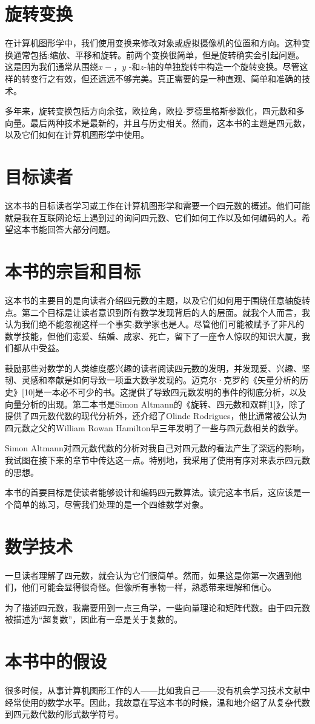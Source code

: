 
\section{旋转变换}
在计算机图形学中，我们使用变换来修改对象或虚拟摄像机的位置和方向。这种变换通常包括:缩放、平移和旋转。前两个变换很简单，但是旋转确实会引起问题。这是因为我们通常从围绕$x-， y$ -和$z$-轴的单独旋转中构造一个旋转变换。尽管这样的转变行之有效，但还远远不够完美。真正需要的是一种直观、简单和准确的技术。

多年来，旋转变换包括方向余弦，欧拉角，欧拉-罗德里格斯参数化，四元数和多向量。最后两种技术是最新的，并且与历史相关。然而，这本书的主题是四元数，以及它们如何在计算机图形学中使用。


\section{目标读者}
这本书的目标读者学习或工作在计算机图形学和需要一个四元数的概述。他们可能就是我在互联网论坛上遇到过的询问四元数、它们如何工作以及如何编码的人。希望这本书能回答大部分问题。


\section{本书的宗旨和目标}
这本书的主要目的是向读者介绍四元数的主题，以及它们如何用于围绕任意轴旋转点。第二个目标是让读者意识到所有数学发现背后的人的层面。就我个人而言，我认为我们绝不能忽视这样一个事实:数学家也是人。尽管他们可能被赋予了非凡的数学技能，但他们恋爱、结婚、成家、死亡，留下了一座令人惊叹的知识大厦，我们都从中受益。

鼓励那些对数学的人类维度感兴趣的读者阅读四元数的发明，并发现爱、兴趣、坚韧、灵感和奉献是如何导致一项重大数学发现的。迈克尔·克罗的《矢量分析的历史》[10]是一本必不可少的书。这提供了导致四元数发明的事件的彻底分析，以及向量分析的出现。第二本书是Simon Altmann的《旋转、四元数和双群[1]》，除了提供了四元数代数的现代分析外，还介绍了Olinde Rodrigues，他比通常被公认为四元数之父的William Rowan Hamilton早三年发明了一些与四元数相关的数学。

Simon Altmann对四元数代数的分析对我自己对四元数的看法产生了深远的影响，我试图在接下来的章节中传达这一点。特别地，我采用了使用有序对来表示四元数的思想。

本书的首要目标是使读者能够设计和编码四元数算法。读完这本书后，这应该是一个简单的练习，尽管我们处理的是一个四维数学对象。

\section{数学技术}
一旦读者理解了四元数，就会认为它们很简单。然而，如果这是你第一次遇到他们，他们可能会显得很奇怪。但像所有事物一样，熟悉带来理解和信心。

为了描述四元数，我需要用到一点三角学，一些向量理论和矩阵代数。由于四元数被描述为“超复数”，因此有一章是关于复数的。


\section{本书中的假设}
很多时候，从事计算机图形工作的人——比如我自己——没有机会学习技术文献中经常使用的数学水平。因此，我故意在写这本书的时候，温和地介绍了从复杂代数到四元数代数的形式数学符号。
